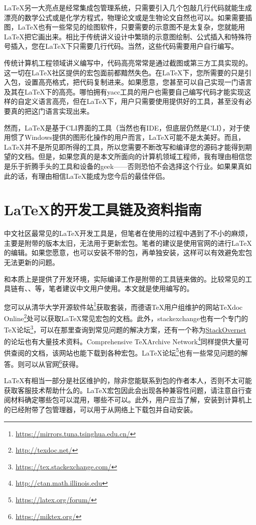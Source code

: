 \LaTeX 另一大亮点是经常集成包管理系统，只需要引入几个包敲几行代码就能生成漂亮的数学公式或是化学方程式，物理论文或是生物论文自然也可以。如果需要插图，\LaTeX 也有一些常见的绘图软件，只要需要的示意图不是太复杂，您就能用\LaTeX 把它画出来。相比于传统讲义设计中繁琐的示意图绘制、公式插入和特殊符号插入，您在\LaTeX 下只需要几行代码。当然，这些代码需要用户自行编写。

传统计算机工程领域讲义编写中，代码高亮常常是通过截图或第三方工具实现的。这一切在\LaTeX 社区提供的宏包面前都黯然失色。在\LaTeX 下，您所需要的只是引入包，设置高亮格式，把代码复制进来。如果愿意，您甚至可以自己实现一门语言及其在\LaTeX 下的高亮。哪怕拥有yacc工具的用户也需要自己编写代码才能实现这样的自定义语言高亮，但在\LaTeX 下，用户只需要使用提供好的工具，甚至没有必要真的把这门语言实现出来。

然而，\LaTeX 是基于CLI界面的工具（当然也有IDE，但底层仍然是CLI），对于使用惯了Windows提供的图形化操作的用户而言，\LaTeX 可能不是太美好。而且，\LaTeX 并不是所见即所得的工具，所以您需要不断改写和编译您的源码才能得到期望的文档。但是，如果您真的是本文所面向的计算机领域工程师，我有理由相信您是乐于折腾手头的工具和设备的geek——否则恐怕不会选择这个行业。如果果真如此的话，有理由相信\LaTeX 能成为您今后的最佳伴侣。

\section{\LaTeX 的开发工具链及资料指南}

中文社区最常见的\LaTeX 开发工具是\CTeX，但笔者在使用\CTeX 的过程中遇到了不小的麻烦，主要是附带的\MiKTeX 版本太旧，无法用于更新宏包。笔者的建议是使用官网的\MiKTeX 进行\LaTeX 的编辑。如果您愿意，也可以安装不带\MiKTeX 的\CTeX 包，再单独安装\MiKTeX，这样可以有效避免宏包无法更新的问题。

\MiKTeX 和\CTeX 本质上是提供了开发环境，实际编译工作是附带的工具链来做的。比较常见的工具链有\pdfLaTeX、\XeLaTeX、\XeTeX 等，笔者建议中文用户使用\XeLaTeX。本文就是使用\XeLaTeX 编写的。

您可以从清华大学开源软件站\footnote{\url{https://mirrors.tuna.tsinghua.edu.cn/}}获取\CTeX 套装，而德语\TeX 用户组维护的网站\TeX doc Online\footnote{\url{http://texdoc.net/}}处可以获取\LaTeX 常见宏包的文档。此外，stackexchange也有一个专门的\TeX 论坛\footnote{\url{https://tex.stackexchange.com/}}，可以在那里查询到常见问题的解决方案，还有一个称为\href{https://stackovernet.com/}{StackOvernet}的论坛也有大量技术资料。Comprehensive \TeX\;Archive Network\footnote{\url{http://ctan.math.illinois.edu}}同样提供大量可供查阅的文档，该网站也能下载到各种宏包。\LaTeX 论坛\footnote{\url{https://latex.org/forum/}}也有一些常见问题的解答。\MiKTeX 则可以从\MiKTeX 官网\footnote{\url{https://miktex.org/}}获得。

\LaTeX 有相当一部分是社区维护的，除非您能联系到包的作者本人，否则不太可能获取客服技术帮助什么的。\LaTeX 宏包因此会出现各种兼容性问题，请注意自行查阅材料确定哪些包可以混用，哪些不可以。此外，\MiKTeX 用户应当了解，安装到计算机上的\MiKTeX 已经附带了包管理器，可以用于从网络上下载包并自动安装。